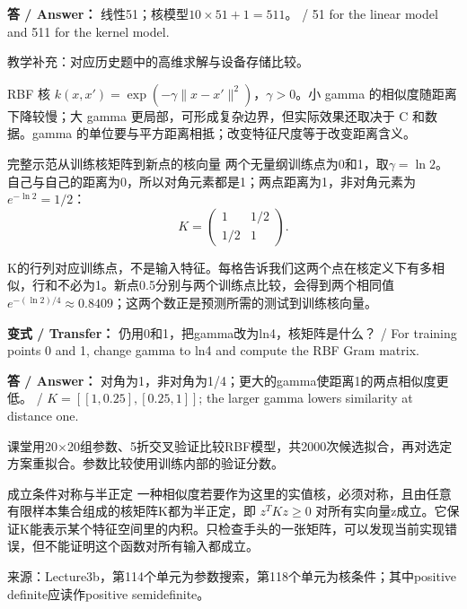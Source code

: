 \textbf{答 / Answer：} 线性51；核模型\(10\times51+1=511\)。 / 51 for the linear model and 511 for the kernel model.


教学补充：对应历史题中的高维求解与设备存储比较。





RBF 核 \(k(x,x')=\exp(-\gamma\|x-x'\|^2)\)，\(\gamma>0\)。小 gamma 的相似度随距离下降较慢；大 gamma 更局部，可形成复杂边界，但实际效果还取决于 C 和数据。gamma 的单位要与平方距离相抵；改变特征尺度等于改变距离含义。


\begin{StudyBlock}{完整示范}{从训练核矩阵到新点的核向量}
两个无量纲训练点为0和1，取\(\gamma=\ln2\)。自己与自己的距离为0，所以对角元素都是1；两点距离为1，非对角元素为\(e^{-\ln2}=1/2\)：
\[
K=\begin{pmatrix}1&1/2\\1/2&1\end{pmatrix}.\tag{3.14}
\]


K的行列对应训练点，不是输入特征。每格告诉我们这两个点在核定义下有多相似，行和不必为1。新点0.5分别与两个训练点比较，会得到两个相同值\(e^{-(\ln2)/4}\approx0.8409\)；这两个数正是预测所需的测试到训练核向量。
\end{StudyBlock}

\textbf{变式 / Transfer：} 仍用0和1，把gamma改为ln4，核矩阵是什么？ / For training points 0 and 1, change gamma to ln4 and compute the RBF Gram matrix.


\textbf{答 / Answer：} 对角为1，非对角为1/4；更大的gamma使距离1的两点相似度更低。 / \(K=[[1,0.25],[0.25,1]]\); the larger gamma lowers similarity at distance one.


课堂用20\ensuremath{\times}20组参数、5折交叉验证比较RBF模型，共2000次候选拟合，再对选定方案重拟合。参数比较使用训练内部的验证分数。


\begin{StudyBlock}{成立条件}{对称与半正定}
一种相似度若要作为这里的实值核，必须对称，且由任意有限样本集合组成的核矩阵K都为半正定，即 \(z^TKz\ge0\) 对所有实向量z成立。它保证K能表示某个特征空间里的内积。只检查手头的一张矩阵，可以发现当前实现错误，但不能证明这个函数对所有输入都成立。
\end{StudyBlock}


来源：Lecture3b，第114个单元为参数搜索，第118个单元为核条件；其中positive definite应读作positive semidefinite。


